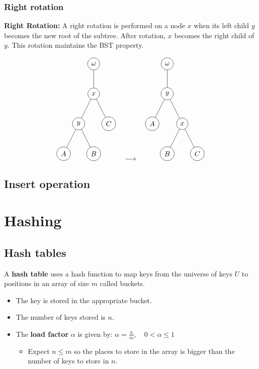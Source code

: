 \documentclass{article}
\begin{document}
\subsubsection{Right rotation}
\begin{definition}
    \textbf{Right Rotation:}
    A right rotation is performed on a node \( x \) when its left child \( y \) becomes the new root of the subtree. After rotation, \( x \) becomes the right child of \( y \). This rotation maintains the BST property.

    \[
    \begin{tikzpicture}[every node/.style={circle,draw},level distance=1.5cm, sibling distance=1.5cm]
    \node (w) {$\omega$}
        child {node (x) {$x$}
            child {node (y) {$y$}
                child {node (A) {$A$}}
                child {node (B) {$B$}}
            }
            child {node (C) {$C$}}
        };
    \end{tikzpicture}
    \quad
    \longrightarrow
    \quad
    \begin{tikzpicture}[every node/.style={circle,draw},level distance=1.5cm, sibling distance=1.5cm]
    \node (w) {$\omega$}
        child {node (y) {$y$}
            child {node (A) {$A$}}
            child {node (x) {$x$}
                child {node (B) {$B$}}
                child {node (C) {$C$}}
            }
        };
    \end{tikzpicture}
    \]
\end{definition}

\subsection{Insert operation}

\newpage

\section{Hashing}
\subsection{Hash tables}
\begin{definition}
    A \textbf{hash table} uses a hash function to map keys from the universe of keys \( U \) to positions in an array of size \( m \) called buckets. 
    \begin{itemize}
        \item The key is stored in the appropriate bucket. 
        \item The number of keys stored is \( n \).
        \item The \textbf{load factor} \( \alpha \) is given by: $\alpha = \frac{n}{m}, \quad 0 < \alpha \leq 1$
        \begin{itemize}
            \item Expect $n \leq m$ so the places to store in the array is bigger than the number of keys to store in $n$.
        \end{itemize}
    \end{itemize}
\end{definition}
\end{document}
